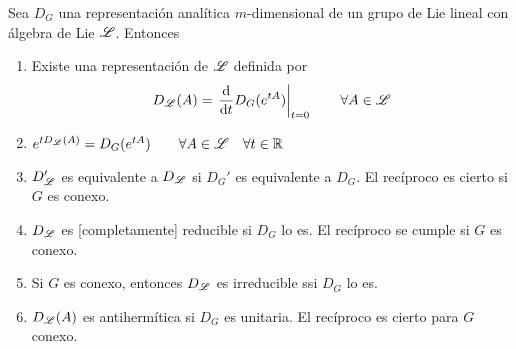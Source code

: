 \begin{teorema}
Sea $D_G$ una representación analítica $m$-dimensional de un grupo de Lie lineal con álgebra de Lie $\mathscr{L}$. Entonces
\begin{enumerate}
\item Existe una representación de $\mathscr{L}$ definida por
\begin{equation}
D_{\mathscr{L}}(A)=\left.\frac{\mathrm{d}}{\mathrm{d}t}D_G(e^{tA})\right|_{t=0}\qquad \forall A\in\mathscr{L}
\end{equation}
\item $e^{tD_{\mathscr{L}}(A)}=D_G(e^{tA})\qquad \forall A\in\mathscr{L}\quad \forall t\in\mathbb{R}$
\item $D_{\mathscr{L}}'$ es equivalente a $D_{\mathscr{L}}$ si $D_G'$ es equivalente a $D_G$. El recíproco es cierto si $G$ es conexo.
\item $D_{\mathscr{L}}$ es [completamente] reducible si $D_G$ lo es. El recíproco se cumple si $G$ es conexo. 
\item Si $G$ es conexo, entonces $D_{\mathscr{L}}$ es irreducible ssi $D_G$ lo es.
\item $D_{\mathscr{L}}(A)$ es antihermítica si $D_G$ es unitaria. El recíproco es cierto para $G$ conexo.
\end{enumerate}
\end{teorema}


